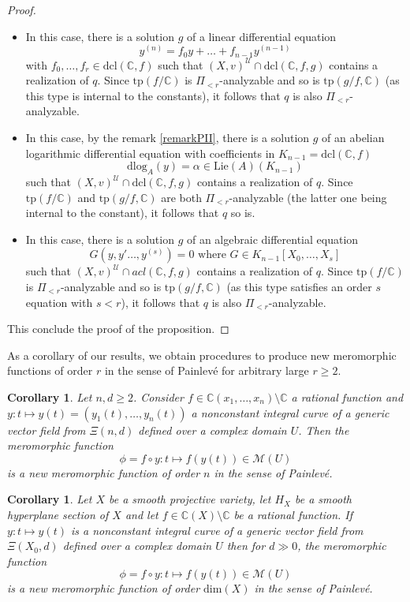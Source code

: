 \documentclass[12pt]{amsart}
\newcommand{\U}{\mathcal{U}}
\theoremstyle{definition}
\theoremstyle{plain}
\newtheorem{corollary}[definition]{Corollary}
\theoremstyle{exampstyle}
\theoremstyle{exampstyle}\newtheorem{thmxbis}{Theorem}
\numberwithin{equation}{section}
\theoremstyle{remark}
\begin{document}
\begin{proof}
\begin{itemize}
\item[(PI)]In this case, there is a solution $g$ of a linear differential equation 
$$ y^{(n)}  = f_0 y  +  \ldots + f_{n-1}y^{(n-1)} $$
with $f_0,\ldots, f_r \in \mathrm{dcl}(\mathbb{C},f)$ such that  
$(X,v)^\U \cap \mathrm{dcl}(\mathbb{C},f,g)$   
contains a realization of $q$. Since $\mathrm{tp}(f/\mathbb{C})$ is $\Pi_{<r}$-analyzable and so is $\mathrm{tp}(g/f,\mathbb{C})$ (as this type is internal to the constants), it follows that $q$ is also $\Pi_{<r}$-analyzable. 

\item[(PII)] In this case, by the remark \ref{remarkPII}, there is a solution $g$ of an abelian logarithmic differential equation with coefficients in $K_{n-1} = \mathrm{dcl}(\mathbb{C}, f)$
$$ \mathrm{dlog}_A(y) = \alpha \in \mathrm{Lie}(A)(K_{n-1}) $$
such that $(X,v)^\U \cap \mathrm{dcl}(\mathbb{C},f,g)$ contains a realization of $q$. Since $\mathrm{tp}(f/\mathbb{C})$ and $\mathrm{tp}(g/f,\mathbb{C})$ are both $\Pi_{<r}$-analyzable (the latter one being internal to the constant), it follows that $q$ so is. 
\item[(PIII$_r$)]  In this case, there is a solution $g$ of an algebraic differential equation 
$$ G(y,y'\ldots, y^{(s)}) = 0 \text{ where } G \in K_{n-1}[X_0,\ldots, X_s]$$
such that
$(X,v)^\U \cap acl(\mathbb{C},f,g)$    
contains a realization of $q$. Since $\mathrm{tp}(f/\mathbb{C})$ is $\Pi_{<r}$-analyzable and so is $\mathrm{tp}(g/f,\mathbb{C})$ (as this type satisfies an order $s$ equation with $s < r$), it follows that $q$ is also $\Pi_{<r}$-analyzable. 
\end{itemize} 
This conclude the proof of the proposition.
\end{proof}


As a corollary of our results, we obtain procedures to produce new meromorphic functions of order $r$ in the sense of Painlevé for arbitrary large $r \geq 2$.

\begin{corollary} 
Let $n,d \geq 2$. Consider $f \in \mathbb{C}(x_1,\ldots, x_n) \setminus \mathbb{C}$ a rational function and 
$y : t \mapsto y(t) = (y_1(t),\ldots, y_n(t))$
a nonconstant integral curve of a generic vector field from $\Xi(n,d)$ defined over a complex domain $U$. Then the meromorphic function $$\phi = f \circ y: t \mapsto f(y(t)) \in \mathcal M(U)$$ is a new meromorphic function of order $n$ in the sense of Painlevé.
\end{corollary} 

\begin{corollary} 
Let $X$ be a smooth projective variety, let $H_X$ be a smooth hyperplane section of $X$ and let $f \in \mathbb{C}(X) \setminus \mathbb{C}$ be a rational function. If
$y : t \mapsto y(t)$
is a nonconstant integral curve of a generic vector field from $\Xi(X_0,d)$ defined over a complex domain $U$ then for $d \gg 0$, the meromorphic function 
$$\phi = f \circ y: t \mapsto f(y(t)) \in \mathcal M(U)$$ is a new meromorphic function of order $\mathrm{dim}(X)$ in the sense of Painlevé.
\end{corollary}
\end{document}
